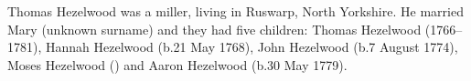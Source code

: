 
Thomas Hezelwood was a miller, living in Ruswarp, North Yorkshire. He married Mary (unknown surname) and they had five children: Thomas Hezelwood (1766--1781), Hannah Hezelwood (b.21 May 1768), John Hezelwood (b.7 August 1774), Moses Hezelwood () and Aaron Hezelwood (b.30 May 1779). \cite{THezelwoodChildren}
